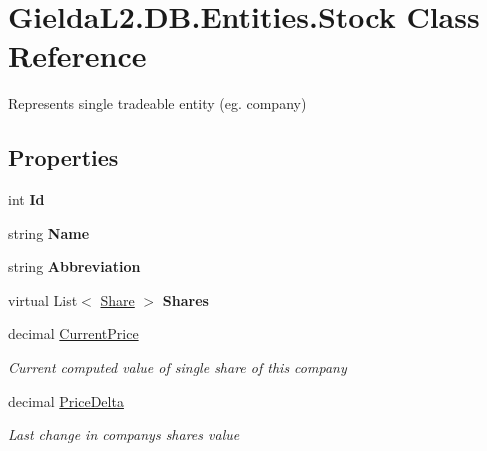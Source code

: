\hypertarget{class_gielda_l2_1_1_d_b_1_1_entities_1_1_stock}{}\section{Gielda\+L2.\+D\+B.\+Entities.\+Stock Class Reference}
\label{class_gielda_l2_1_1_d_b_1_1_entities_1_1_stock}


Represents single tradeable entity (eg. company)  


\subsection*{Properties}
\begin{DoxyCompactItemize}
\item 
\mbox{\label{class_gielda_l2_1_1_d_b_1_1_entities_1_1_stock_a34c637c4056bf95f415fbd9a5ff63171}} 
int {\bfseries Id}
\item 
\mbox{\label{class_gielda_l2_1_1_d_b_1_1_entities_1_1_stock_a6eaff6003a67a69ffc72304cec9e1630}} 
string {\bfseries Name}
\item 
\mbox{\label{class_gielda_l2_1_1_d_b_1_1_entities_1_1_stock_a08aeea6cee5afedbd7a7a3a296599b85}} 
string {\bfseries Abbreviation}
\item 
\mbox{\label{class_gielda_l2_1_1_d_b_1_1_entities_1_1_stock_adc6315cae5ea3f9fd30e9d217905e9a2}} 
virtual List$<$ \mbox{\hyperlink{class_gielda_l2_1_1_d_b_1_1_entities_1_1_share}{Share}} $>$ {\bfseries Shares}
\item 
decimal \mbox{\hyperlink{class_gielda_l2_1_1_d_b_1_1_entities_1_1_stock_a6f7d6e47c44e70138e95c1aa21bde708}{Current\+Price}}
\begin{DoxyCompactList}\small\item\em Current computed value of single share of this company \end{DoxyCompactList}\item 
decimal \mbox{\hyperlink{class_gielda_l2_1_1_d_b_1_1_entities_1_1_stock_a81e7483e621a4c6baada66f707ab0c71}{Price\+Delta}}
\begin{DoxyCompactList}\small\item\em Last change in company\textquotesingle{}s shares value \end{DoxyCompactList}\end{DoxyCompactItemize}


